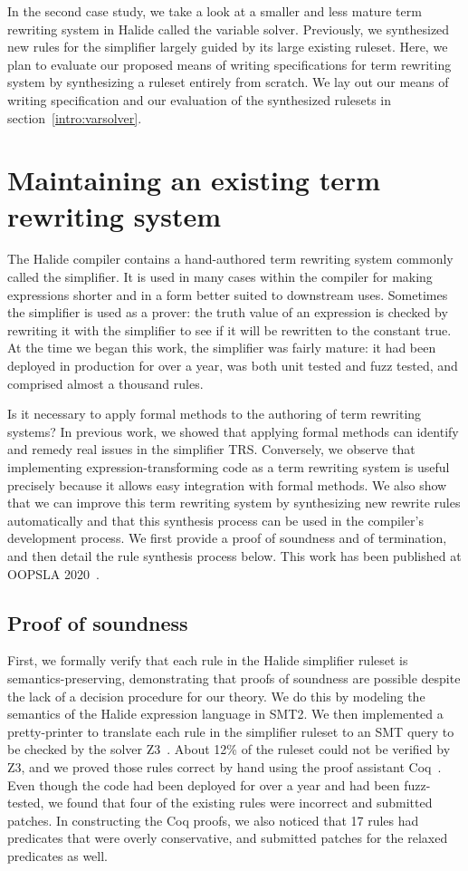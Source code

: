 In the second case study, we take a look at a smaller and less mature term rewriting system in Halide called the variable solver. Previously, we synthesized new rules for the simplifier largely guided by its large existing ruleset. Here, we plan to evaluate our proposed means of writing specifications for term rewriting system by synthesizing a ruleset entirely from scratch. We lay out our means of writing specification and our evaluation of the synthesized rulesets in section~\ref{intro:varsolver}.

\section{Maintaining an existing term rewriting system}
\label{sec:prior}

The Halide compiler contains a hand-authored term rewriting system commonly called the simplifier. It is used in many cases within the compiler for making expressions shorter and in a form better suited to downstream uses. Sometimes the simplifier is used as a prover: the truth value of an expression is checked by rewriting it with the simplifier to see if it will be rewritten to the constant true. At the time we began this work, the simplifier was fairly mature: it had been deployed in production for over a year, was both unit tested and fuzz tested, and comprised almost a thousand rules.

Is it necessary to apply formal methods to the authoring of term rewriting systems? In previous work, we showed that applying formal methods can identify and remedy real issues in the simplifier TRS. Conversely, we observe that implementing expression-transforming code as a term rewriting system is useful precisely because it allows easy integration with formal methods. We also show that we can improve this term rewriting system by synthesizing new rewrite rules automatically and that this synthesis process can be used in the compiler's development process. We first provide a proof of soundness and of termination, and then detail the rule synthesis process below. This work has been published at OOPSLA 2020~\cite{newcomb2020verifying}.

\subsection{Proof of soundness}
First, we formally verify that each rule in the Halide simplifier ruleset is semantics-preserving, demonstrating that proofs of soundness are possible despite the lack of a 
decision procedure for our theory. We do this by modeling the semantics of the Halide expression language in SMT2. We then implemented a pretty-printer to translate each rule in the simplifier ruleset to an SMT query to be checked by the solver Z3~\cite{de2008z3}. About 12\% of the ruleset could not be verified by Z3, and we proved those rules correct by hand using the proof assistant Coq~\cite{Coq19}. Even though the code had been deployed for over a year and had been fuzz-tested, we found that four of the existing rules were incorrect and submitted patches. In constructing the Coq proofs, we also noticed that 17 rules had predicates that were overly conservative, and submitted patches for the relaxed predicates as well.

